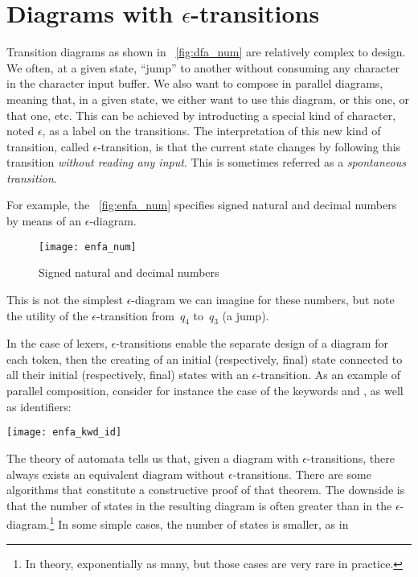 \documentclass[12pt,a4paper]{article}
\begin{document}
\section{Diagrams with \(\epsilon\)-transitions}

Transition diagrams as shown in \fig~\vref{fig:dfa_num} are relatively
complex to design. We often, at a given state, ``jump'' to another
without consuming any character in the character input buffer. We also
want to compose in parallel diagrams, meaning that, in a given state,
we either want to use this diagram, or this one, or that one,
etc. This can be achieved by introducting a special kind of character,
noted \(\epsilon\), as a label on the transitions. The interpretation
of this new kind of transition, called \(\epsilon\)-transition, is
that the current state changes by following this transition
\emph{without reading any input}. This is sometimes referred as a
\emph{spontaneous transition}.

For example, the \fig~\vref{fig:enfa_num} specifies signed natural and
decimal numbers by means of an \(\epsilon\)-diagram.
\begin{figure}
\centering
\texttt{[image: enfa\_num]}
\caption{Signed natural and decimal numbers\label{fig:enfa_num}}
\end{figure}
This is not the simplest \(\epsilon\)-diagram we can imagine for these
numbers, but note the utility of the \(\epsilon\)-transition
from~\(q_4\) to~\(q_3\) (a jump).

In the case of lexers, \(\epsilon\)-transitions enable the separate
design of a diagram for each token, then the creating of an initial
(respectively, final) state connected to all their initial
(respectively, final) states with an \(\epsilon\)-transition.  As an
example of parallel composition, consider for instance the case of the
keywords  and , as well as identifiers:
\begin{center}
\texttt{[image: enfa\_kwd\_id]}
\end{center}



The theory of automata tells us that, given a diagram with
\(\epsilon\)-transitions, there always exists an equivalent diagram
without \(\epsilon\)-transitions. There are some algorithms that
constitute a constructive proof of that theorem. The downside is that
the number of states in the resulting diagram is often greater than in
the \(\epsilon\)-diagram.\footnote{In theory, exponentially as many,
  but those cases are very rare in practice.} In some simple cases,
the number of states is smaller, as in
\end{document}
